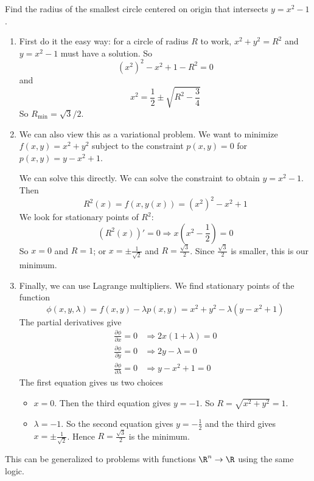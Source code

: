 \documentclass[a4paper]{article}
\begin{document}
\begin{eg}
  Find the radius of the smallest circle centered on origin that intersects $y = x^2 - 1$.

  \begin{enumerate}
    \item  First do it the easy way: for a circle of radius $R$ to work, $x^2 + y^2 = R^2$ and $y = x^2 - 1$ must have a solution. So
      \[
        (x^2)^2 - x^2 + 1 - R^2 = 0
      \]
      and
      \[
        x^2 = \frac{1}{2}\pm \sqrt{R^2 - \frac{3}{4}}
      \]
      So $R_{\min} = \sqrt{3}/2$.

    \item We can also view this as a variational problem. We want to minimize $f(x, y) = x^2 + y^2$ subject to the constraint $p(x, y) = 0$ for $p(x, y) = y - x^2 + 1$.

      We can solve this directly. We can solve the constraint to obtain $y = x^2 - 1$. Then
      \[
        R^2(x) = f(x, y(x)) = (x^2)^2 - x^2  + 1
      \]
      We look for stationary points of $R^2$:
      \[
        (R^2(x))' = 0 \Rightarrow  x\left(x^2 - \frac{1}{2}\right)= 0
      \]
      So $x = 0$ and $R = 1$; or $x = \pm \frac{1}{\sqrt{2}}$ and $R = \frac{\sqrt{3}}{2}$. Since $\frac{\sqrt{3}}{2}$ is smaller, this is our minimum.

    \item Finally, we can use Lagrange multipliers. We find stationary points of the function
      \[
        \phi(x, y, \lambda) = f(x, y) - \lambda p(x, y) = x^2 + y^2 - \lambda (y - x^2 + 1)
      \]
      The partial derivatives give
      \begin{align*}
        \frac{\partial \phi}{\partial x} = 0 &\Rightarrow 2x(1 + \lambda) = 0\\
        \frac{\partial \phi}{\partial y} = 0 &\Rightarrow 2y - \lambda = 0\\
        \frac{\partial \phi}{\partial \lambda} = 0 &\Rightarrow y - x^2 + 1 = 0
      \end{align*}
      The first equation gives us two choices
      \begin{itemize}
        \item $x = 0$. Then the third equation gives $y = -1$. So $R = \sqrt{x^2 + y^2} = 1$.
        \item $\lambda = -1$. So the second equation gives $y = -\frac{1}{2}$ and the third gives $x = \pm \frac{1}{\sqrt{2}}$. Hence $R = \frac{\sqrt{3}}{2}$ is the minimum.
      \end{itemize}
  \end{enumerate}
\end{eg}
This can be generalized to problems with functions $\R^n \to \R$ using the same logic.
\end{document}
